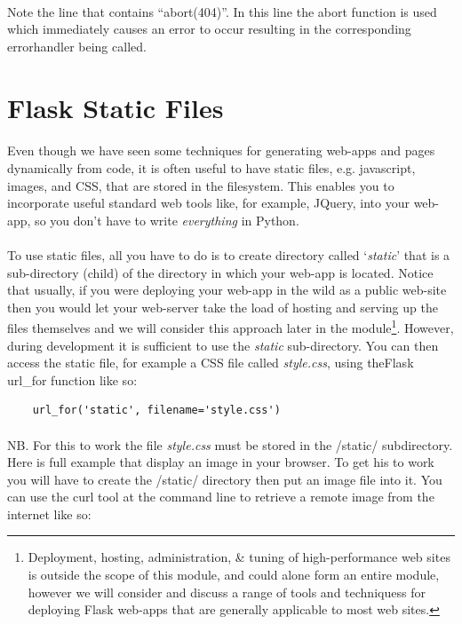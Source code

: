 \documentclass[12pt, a4paper, twoside]{book}
\begin{document}
\paragraph{} Note the line that contains ``abort(404)''. In this line the abort function is used which immediately causes an error to occur resulting in the corresponding errorhandler being called.

\section{Flask Static Files}
\label{static}
\paragraph{} Even though we have seen some techniques for generating web-apps and pages dynamically from code, it is often useful to have static files, e.g. javascript, images, and CSS, that are stored in the filesystem. This enables you to incorporate useful standard web tools like, for example, JQuery, into your web-app, so you don't have to write \emph{everything} in Python.

\paragraph{} To use static files, all you have to do is to create directory called `\emph{static}' that is a sub-directory (child) of the directory in which your web-app is located. Notice that usually, if you were deploying your web-app in the wild as a public web-site then you would let your web-server take the load of hosting and serving up the files themselves and we will consider this approach later in the module\footnote{Deployment, hosting, administration, \& tuning of high-performance web sites is outside the scope of this module, and could alone form an entire module, however we will consider and discuss a range of tools and techniquess for deploying Flask web-apps that are generally applicable to most web sites.}. However, during development it is sufficient to use the \emph{static} sub-directory. You can then access the static file, for example a CSS file called \emph{style.css}, using theFlask url\_for function like so:

\begin{lstlisting}
    url_for('static', filename='style.css')
\end{lstlisting}

\paragraph{} NB. For this to work the file \emph{style.css} must be stored in the /static/ subdirectory. Here is full example that display an image in your browser. To get his to work you will have to create the /static/ directory then put an image file into it. You can use the curl tool at the command line to retrieve a remote image from the internet like so:
\end{document}
